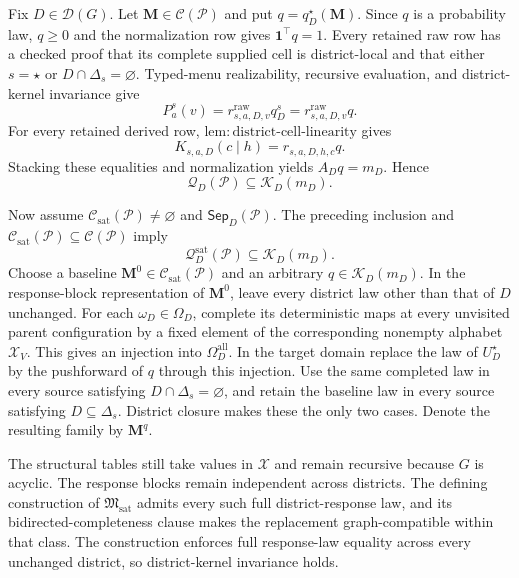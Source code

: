 Fix \(D\in\mathcal D(G)\). Let \(\mathbf M\in\mathcal C(\mathcal P)\) and put \(q=q_D^\star(\mathbf M)\). Since \(q\) is a probability law, \(q\geq0\) and the normalization row gives \(\mathbf 1^\top q=1\). Every retained raw row has a checked proof that its complete supplied cell is district-local and that either \(s=\star\) or \(D\cap\Delta_s=\varnothing\). Typed-menu realizability, recursive evaluation, and district-kernel invariance give
\[
P_a^s(v)=r^{\mathrm{raw}}_{s,a,D,v}q_D^s
=r^{\mathrm{raw}}_{s,a,D,v}q.
\]
For every retained derived row, \(\mathrm{lem:district\text{-}cell\text{-}linearity}\) gives
\[
K_{s,a,D}(c\mid h)=r_{s,a,D,h,c}q.
\]
Stacking these equalities and normalization yields \(A_Dq=m_D\). Hence
\[
\mathcal Q_D(\mathcal P)\subseteq\mathcal K_D(m_D).
\]

Now assume \(\mathcal C_{\mathrm{sat}}(\mathcal P)\ne\varnothing\) and \(\mathsf{Sep}_D(\mathcal P)\). The preceding inclusion and \(\mathcal C_{\mathrm{sat}}(\mathcal P)\subseteq\mathcal C(\mathcal P)\) imply
\[
\mathcal Q_D^{\mathrm{sat}}(\mathcal P)\subseteq\mathcal K_D(m_D).
\]
Choose a baseline \(\mathbf M^0\in\mathcal C_{\mathrm{sat}}(\mathcal P)\) and an arbitrary \(q\in\mathcal K_D(m_D)\). In the response-block representation of \(\mathbf M^0\), leave every district law other than that of \(D\) unchanged. For each \(\omega_D\in\Omega_D\), complete its deterministic maps at every unvisited parent configuration by a fixed element of the corresponding nonempty alphabet \(\mathcal X_V\). This gives an injection into \(\Omega_D^{\mathrm{all}}\). In the target domain replace the law of \(U_D^\star\) by the pushforward of \(q\) through this injection. Use the same completed law in every source satisfying \(D\cap\Delta_s=\varnothing\), and retain the baseline law in every source satisfying \(D\subseteq\Delta_s\). District closure makes these the only two cases. Denote the resulting family by \(\mathbf M^q\).

The structural tables still take values in \(\mathcal X\) and remain recursive because \(G\) is acyclic. The response blocks remain independent across districts. The defining construction of \(\mathfrak M_{\mathrm{sat}}\) admits every such full district-response law, and its bidirected-completeness clause makes the replacement graph-compatible within that class. The construction enforces full response-law equality across every unchanged district, so district-kernel invariance holds.

